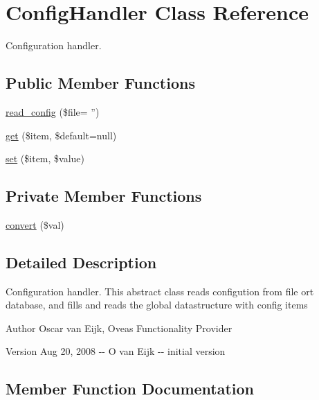 \section{ConfigHandler Class Reference}
\label{classConfigHandler}


Configuration handler.  


\subsection*{Public Member Functions}
\begin{DoxyCompactItemize}
\item 
\hyperlink{classConfigHandler_a75a7f03f156cd0f315f91ec4bbddfbb6}{read\_\-config} (\$file= '')
\item 
\hyperlink{classConfigHandler_ab8a7633a5a352c40d5c1380e04ffd199}{get} (\$item, \$default=null)
\item 
\hyperlink{classConfigHandler_ac947c34c710d66558da03ff632c32075}{set} (\$item, \$value)
\end{DoxyCompactItemize}
\subsection*{Private Member Functions}
\begin{DoxyCompactItemize}
\item 
\hyperlink{classConfigHandler_adf3dd923bfd38e0274dc86ebd0caed92}{convert} (\$val)
\end{DoxyCompactItemize}


\subsection{Detailed Description}
Configuration handler. This abstract class reads configution from file ort database, and fills and reads the global datastructure with config items \begin{DoxyAuthor}{Author}
Oscar van Eijk, Oveas Functionality Provider 
\end{DoxyAuthor}
\begin{DoxyVersion}{Version}
Aug 20, 2008 -\/-\/ O van Eijk -\/-\/ initial version 
\end{DoxyVersion}


\subsection{Member Function Documentation}

